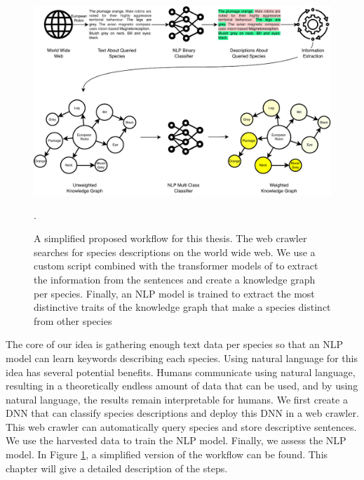 \documentclass[a4paper, 12pt, oneside]{book} %
\begin{document}
\begin{figure} [htpb]
    \centering
    \includegraphics[width=\textwidth]{figures/workflow.pdf}
    \caption[Proposed Workflow]{A simplified proposed workflow for this thesis. The web crawler searches for species descriptions on the world wide web. We use a custom script combined with the transformer models of \textcite{wolf_huggingfaces_2020} to extract the information from the sentences and create a knowledge graph per species. Finally, an NLP model is trained to extract the most distinctive traits of the knowledge graph that make a species distinct from other species}.
    \label{fig:workflow}
\end{figure}

The core of our idea is gathering enough text data per species so that an NLP model can learn keywords describing each species.
Using natural language for this idea has several potential benefits.
Humans communicate using natural language, resulting in a theoretically endless amount of data that can be used, and by using natural language, the results remain interpretable for humans.
We first create a DNN that can classify species descriptions and deploy this DNN in a web crawler.
This web crawler can automatically query species and store descriptive sentences.
We use the harvested data to train the NLP model.
Finally, we assess the NLP model.
In Figure \ref{fig:workflow}, a simplified version of the workflow can be found.
This chapter will give a detailed description of the steps.
\end{document}
